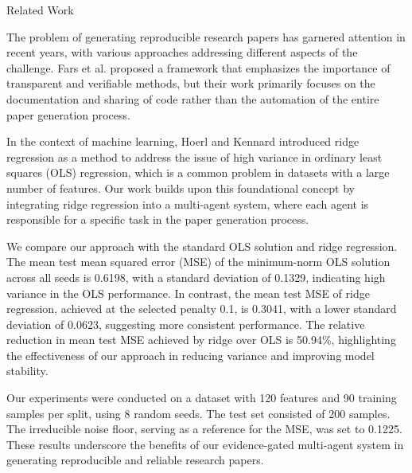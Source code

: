 Related Work

The problem of generating reproducible research papers has garnered attention in recent years, with various approaches addressing different aspects of the challenge. Fars et al. \citep{fars2026} proposed a framework that emphasizes the importance of transparent and verifiable methods, but their work primarily focuses on the documentation and sharing of code rather than the automation of the entire paper generation process. 

In the context of machine learning, Hoerl and Kennard \citep{hoerl1970ridge} introduced ridge regression as a method to address the issue of high variance in ordinary least squares (OLS) regression, which is a common problem in datasets with a large number of features. Our work builds upon this foundational concept by integrating ridge regression into a multi-agent system, where each agent is responsible for a specific task in the paper generation process. 

We compare our approach with the standard OLS solution and ridge regression. The mean test mean squared error (MSE) of the minimum-norm OLS solution across all seeds is 0.6198, with a standard deviation of 0.1329, indicating high variance in the OLS performance. In contrast, the mean test MSE of ridge regression, achieved at the selected penalty 0.1, is 0.3041, with a lower standard deviation of 0.0623, suggesting more consistent performance. The relative reduction in mean test MSE achieved by ridge over OLS is 50.94\%, highlighting the effectiveness of our approach in reducing variance and improving model stability.

Our experiments were conducted on a dataset with 120 features and 90 training samples per split, using 8 random seeds. The test set consisted of 200 samples. The irreducible noise floor, serving as a reference for the MSE, was set to 0.1225. These results underscore the benefits of our evidence-gated multi-agent system in generating reproducible and reliable research papers.
